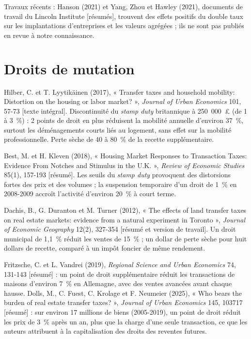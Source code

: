 \documentclass[11pt,a4paper]{article}
\newcommand{\lu}[1]{{\footnotesize\color{ocre}[#1]}}
\begin{document}
Travaux récents : Hanson (2021) et Yang, Zhou et Hawley (2021), documents de travail du Lincoln
Institute \lu{résumés}, trouvent des effets positifs du double taux sur les implantations
d'entreprises et les valeurs agrégées ; ils ne sont pas publiés en revue à notre connaissance.

\section{Droits de mutation}

Hilber, C. et T. Lyytikäinen (2017), « Transfer taxes and household mobility: Distortion on the
housing or labor market? », \emph{Journal of Urban Economics} 101, 57-73 \lu{texte intégral}.
Discontinuité du \emph{stamp duty} britannique à 250~000~£ (de 1 à 3~\%) : 2 points de droit en
plus réduisent la mobilité annuelle d'environ 37~\%, surtout les déménagements courts liés au
logement, sans effet sur la mobilité professionnelle. Perte sèche de 40 à 80~\% de la recette
supplémentaire.

Best, M. et H. Kleven (2018), « Housing Market Responses to Transaction Taxes: Evidence From
Notches and Stimulus in the U.K. », \emph{Review of Economic Studies} 85(1), 157-193 \lu{résumé}.
Les seuils du \emph{stamp duty} provoquent des distorsions fortes des prix et des volumes ; la
suspension temporaire d'un droit de 1~\% en 2008-2009 accroît l'activité d'environ 20~\% à court
terme.

Dachis, B., G. Duranton et M. Turner (2012), « The effects of land transfer taxes on real estate
markets: evidence from a natural experiment in Toronto », \emph{Journal of Economic Geography}
12(2), 327-354 \lu{résumé et version de travail}. Un droit municipal de 1,1~\% réduit les ventes de
15~\% ; un dollar de perte sèche pour huit dollars de recette, comparé à un impôt foncier de même
rendement.

Fritzsche, C. et L. Vandrei (2019), \emph{Regional Science and Urban Economics} 74, 131-143
\lu{résumé} : un point de droit supplémentaire réduit les transactions de maisons d'environ 7~\% en
Allemagne, avec des ventes avancées avant chaque hausse. Dolls, M., C. Fuest, C. Krolage et
F. Neumeier (2025), « Who bears the burden of real estate transfer taxes? », \emph{Journal of
Urban Economics} 145, 103717 \lu{résumé} : sur environ 17 millions de biens (2005-2019), un point de droit réduit les
prix de 3~\% après un an, plus que la charge d'une seule transaction, ce que les auteurs
attribuent à la capitalisation des droits des reventes futures.
\end{document}
